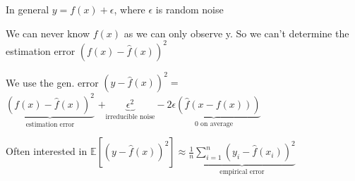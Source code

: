 In general $y = f(x) + \epsilon$, where $\epsilon$ is random noise

We can never know $f(x)$ as we can only observe y. So we can't determine the estimation error $(f(x) - \hat{f}(x))^2$

We use the gen. error $(y-\hat{f}(x))^2 =$ \\$\underbrace{(f(x) - \hat{f}(x))^2}_{\text{estimation error}}$ $+ \underbrace{\epsilon^2}_{\text{irreducible noise}} - \underbrace{2\epsilon(\hat{f}(x - f(x)))}_{0 \text{ on average}}$

Often interested in $\mathbb{E}\left[(y-\hat{f}(x))^2\right] \approx \underbrace{\frac{1}{n}\sum_{i=1}^n (y_i-\hat{f}(x_i))^2}_{\text{empirical error}}$



